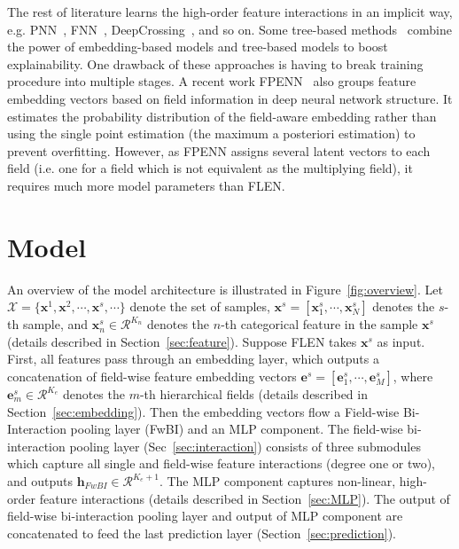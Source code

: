 \documentclass[sigconf]{acmart}
\newcommand{\Real}{\mathcal{R}}
\begin{document}
The rest of literature learns the high-order feature interactions in an implicit way, e.g. PNN~\citep{qu2018product}, FNN~\citep{zhang2016deep}, DeepCrossing~\citep{shan2016deep}, and so on. Some tree-based methods~\citep{zhu2017deep,wang2018tem} combine the power of embedding-based models and tree-based models to boost explainability. One drawback of these approaches is having to break training procedure into multiple stages.
A recent work FPENN~\citep{Liu2018Field} also groups feature embedding vectors based on field information in deep neural network structure. 
It estimates the probability distribution of the field-aware embedding rather than using the single point estimation (the maximum a posteriori estimation) to prevent overfitting. 
However, as FPENN assigns several latent vectors to each field (i.e. one for a field which is not equivalent as the multiplying field), it requires much more model parameters than FLEN. 

\section{Model}\label{sec::model}
An overview of the model architecture is illustrated in Figure~\ref{fig:overview}.
Let $\mathcal{X}=\{\mathbf{x}^1,\mathbf{x}^2,\cdots,\mathbf{x}^s,\cdots\}$ denote the set of samples, 
$\mathbf{x}^{s}=[\mathbf{x}_1^{s},\cdots, \mathbf{x}_N^{s}]$ denotes the $s$-th sample, and $\mathbf{x}_n^{s}\in\Real^{K_n}$ denotes the $n$-th categorical feature in the sample $\mathbf{x}^{s}$ (details described in Section~\ref{sec:feature}). 
Suppose FLEN takes $\mathbf{x}^{s}$ as input.
First, all features pass through an embedding layer, which outputs a concatenation of field-wise feature embedding vectors $\mathbf{e}^{s}=[\mathbf{e}_{1}^s,\cdots,\mathbf{e}_M^s]$, where $\mathbf{e}_m^s\in \Real^{K_e}$ denotes the $m$-th hierarchical fields (details described in Section~\ref{sec:embedding}).
Then the embedding vectors flow a Field-wise Bi-Interaction pooling layer (FwBI) and an MLP component. The field-wise bi-interaction pooling layer (Sec~\ref{sec:interaction}) consists of three submodules which capture all single and field-wise feature interactions (degree one or two), and outputs $\mathbf{h}_{FwBI}\in\Real^{K_{e}+1}$.
The MLP component captures non-linear, high-order feature interactions (details described in Section~\ref{sec:MLP}). The output of field-wise bi-interaction pooling layer and output of MLP component are concatenated to feed the last prediction layer (Section~\ref{sec:prediction}). 
\end{document}

